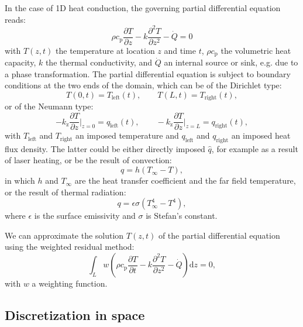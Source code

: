 \documentclass[10pt, a4paper, twoside, headinclude,footinclude, BCOR5mm]{scrartcl}
\begin{document}
In the case of 1D heat conduction, the governing partial differential equation reads:
\begin{equation}
  \rho c_\text{p}\frac{\partial T}{\partial z} -
  k\frac{\partial^2 T}{\partial z^2} -
  \dot{Q} = 0
  \label{eq:pde}
\end{equation}
with \(T(z,t)\) the temperature at location \(z\) and time \(t\), \(\rho c_{\text{p}}\) the volumetric heat capacity, \(k\) the thermal conductivity, and \(\dot{Q}\) an internal  source or sink, e.g. due to a phase transformation. The partial differential equation is subject to boundary conditions at the two ends of the domain, which can be of the Dirichlet type:
\begin{equation*}
  T(0,t) = T_\text{left}(t), \qquad T(L,t) = T_\text{right}(t),
\end{equation*}
or of the Neumann type:
\begin{equation*}
  -k_{\text{z}}\frac{\partial T}{\partial z}\Biggr|_{z=0} = q_\text{left}(t), \qquad
  -k_{\text{z}}\frac{\partial T}{\partial z}\Biggr|_{z=L} = q_{\text{right}}(t),
\end{equation*}
with \(T_\text{left}\) and \(T_\text{right}\) an imposed temperature and \(q_\text{left}\) and \(q_\text{right}\) an imposed heat flux density. The latter could be either directly imposed \(\hat{q}\), for example as a result of laser heating, or be the result of convection:
\begin{equation*}
  q = h(T_{\infty}-T),
\end{equation*}
in which \(h\) and \(T_{\infty}\) are the heat transfer coefficient and the far field temperature, or the result of thermal radiation:
\begin{equation*}
  q = \epsilon\sigma(T_{\infty}^4-T^4),
\end{equation*}
where \(\epsilon\) is the surface emissivity and \(\sigma\) is Stefan's constant.

We can approximate the solution \(T(z,t)\) of the partial differential equation using the weighted residual method:
\begin{equation}
  \int_L w\left(
  \rho c_\text{p} \frac{\partial T}{\partial t} -
  k \frac{\partial^2 T}{\partial z^2} -
  \dot{Q} \right) \text{d}z = 0,
  \label{eq:weighted_residual}
\end{equation}
with \(w\) a weighting function.


\subsection{Discretization in space}
\label{sec:org24ee86a}
\end{document}
